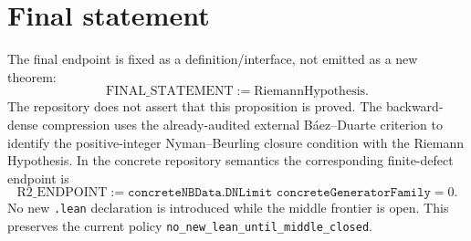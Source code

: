 \section{Final statement}
The final endpoint is fixed as a definition/interface, not emitted as a new theorem:
\[
\boxed{\mathrm{FINAL\_STATEMENT}:=\mathrm{RiemannHypothesis}.}
\]
The repository does not assert that this proposition is proved. The backward-dense
compression uses the already-audited external B\'aez--Duarte criterion to identify
the positive-integer Nyman--Beurling closure condition with the Riemann Hypothesis.
In the concrete repository semantics the corresponding finite-defect endpoint is
\[
\boxed{
\mathrm{R2\_ENDPOINT}:=
\texttt{concreteNBData.DNLimit concreteGeneratorFamily}=0.
}
\]
No new \texttt{.lean} declaration is introduced while the middle frontier is open.
This preserves the current policy \texttt{no\_new\_lean\_until\_middle\_closed}.
